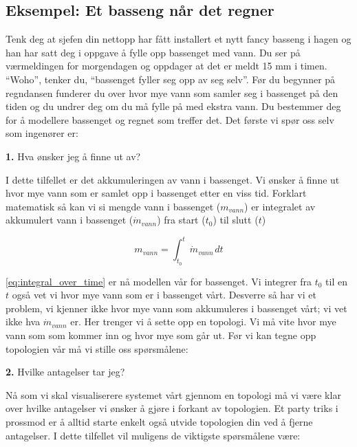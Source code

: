  
\subsection{Eksempel: Et basseng når det regner}
Tenk deg at sjefen din nettopp har fått installert et nytt fancy basseng i hagen og han har satt deg i oppgave å fylle opp bassenget med vann. Du ser på værmeldingen for morgendagen og oppdager at det er meldt 15 mm i timen. \enquote{Woho}, tenker du, \enquote{bassenget fyller seg opp av seg selv}. Før du begynner på regndansen funderer du over hvor mye vann som samler seg i bassenget på den tiden og du undrer deg om du må fylle på med ekstra vann. Du bestemmer deg for å modellere bassenget og regnet som treffer det. Det første vi spør oss selv som ingenører er: 

\begin{center}
    \textbf{1.} Hva ønsker jeg å finne ut av?
\end{center}

I dette tilfellet er det akkumuleringen av vann i bassenget. Vi ønsker å finne ut hvor mye vann som er samlet opp i bassenget etter en viss tid. Forklart matematisk så kan vi si mengde vann i bassenget ($m_{vann}$) er integralet av akkumulert vann i bassenget ($\dot{m}_{vann}$) fra start ($t_0$) til slutt ($t$)

\begin{equation}\label{eq:integral_over_time}
    m_{vann} = \int_{t_0}^{t}\dot{m}_{vann\,}dt 
\end{equation}

\cref{eq:integral_over_time} er nå modellen vår for bassenget. Vi integrer fra $t_0$ til en $t$ også vet vi hvor mye vann som er i bassenget vårt. Desverre så har vi et problem, vi kjenner ikke hvor mye vann som akkumuleres i bassenget vårt; vi vet ikke hva $\dot{m}_{vann}$ er. Her trenger vi å sette opp en topologi. Vi må vite hvor mye vann som som kommer inn og hvor mye som går ut. Før vi kan tegne opp topologien vår må vi stille oss spørsmålene:

\begin{center}
    \textbf{2.} Hvilke antagelser tar jeg?
\end{center}

Nå som vi skal visualiserere systemet vårt gjennom en topologi må vi være klar over hvilke antagelser vi ønsker å gjøre i forkant av topologien. Et party triks i prossmod er å alltid starte enkelt også utvide topologien din ved å fjerne antagelser. I dette tilfellet vil muligens de viktigste spørsmålene være:

